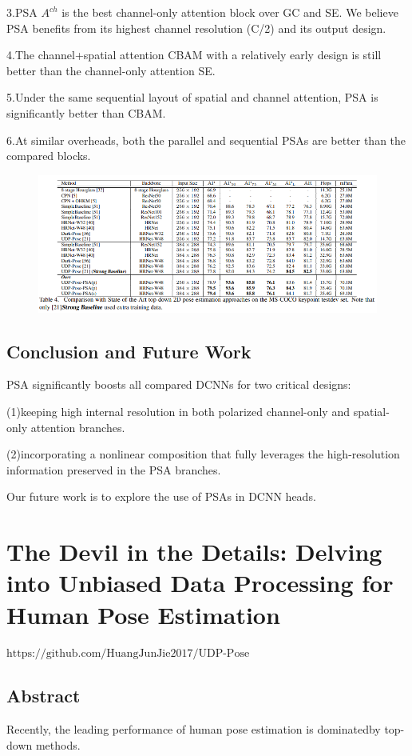\documentclass[11pt]{article}
\begin{document}
3.PSA $A^{ch}$ is the best channel-only attention block over GC and SE. We believe PSA benefits from its highest channel resolution (C/2) and its output design.

4.The channel+spatial attention CBAM with a relatively early design is still better than the channel-only attention SE.

5.Under the same sequential layout of spatial and channel attention, PSA is significantly better than CBAM.

6.At similar overheads, both the parallel and sequential PSAs are better than the compared blocks.

\begin{figure}[H]
	\centering
	\includegraphics[scale = 0.5]{22}
\end{figure}
\subsection{Conclusion and Future Work}
PSA significantly boosts all compared DCNNs for two critical designs:

(1)keeping high internal resolution in both polarized channel-only and spatial-only attention branches.

(2)incorporating a nonlinear composition that fully leverages the high-resolution information preserved in the PSA branches.

Our future work is to explore the use of PSAs in DCNN heads.
\section{The Devil in the Details: Delving into Unbiased Data Processing for Human Pose Estimation}
$\text{https://github.com/HuangJunJie2017/UDP-Pose}$
\subsection{Abstract}
Recently, the leading performance of human pose estimation is dominatedby top-down methods.
\end{document}
